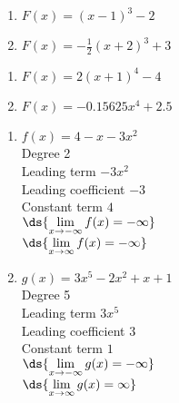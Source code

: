 \documentclass{ximera}
\begin{document}
\begin{enumerate}
\setcounter{enumi}{\value{HW}}

\item  $F(x) = (x-1)^3-2$ 
\item $F(x) = -\frac{1}{2} (x+2)^3+3$

\setcounter{HW}{\value{enumi}}
\end{enumerate}

\begin{enumerate}
\setcounter{enumi}{\value{HW}}

\item  $F(x) = 2(x+1)^4-4$ \
\item $F(x) = -0.15625x^4+2.5$

\setcounter{HW}{\value{enumi}}
\end{enumerate}


\begin{enumerate}
\setcounter{enumi}{\value{HW}}
\item $f(x) = 4-x-3x^2$ \\
Degree 2 \\
Leading term $-3x^{2}$\\
Leading coefficient $-3$\\
Constant term $4$\\
$\ds{\lim_{x \rightarrow - \infty} f(x)  = -\infty}$ \\
$\ds{\lim_{x \rightarrow  \infty} f(x)  = -\infty}$ \\


\item  $g(x) = 3x^5 - 2x^2 + x + 1$ \\
Degree 5 \\
Leading term $3x^5$\\
Leading coefficient $3$\\
Constant term $1$\\
$\ds{\lim_{x \rightarrow - \infty} g(x)  = -\infty}$ \\
$\ds{\lim_{x \rightarrow \infty} g(x)  = \infty}$ \\



\setcounter{HW}{\value{enumi}}
\end{enumerate}
\end{document}
